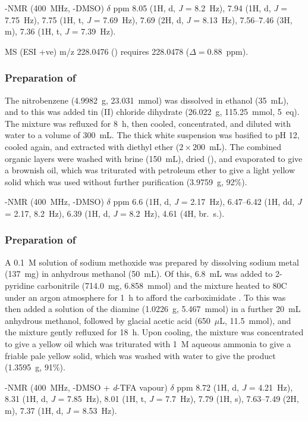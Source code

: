 \begin{refsection}
-NMR (400~MHz, -DMSO) $\delta$ ppm 8.05 (1H, d, \emph{J} = 8.2~Hz), 7.94 (1H, d, \emph{J} = 7.75~Hz), 7.75 (1H, t, \emph{J} = 7.69~Hz), 7.69 (2H, d, \emph{J} = 8.13~Hz), 7.56--7.46 (3H, m), 7.36 (1H, t, \emph{J} = 7.39~Hz).

MS (ESI +ve) m/z 228.0476 ()  requires 228.0478 ($\Delta=0.88$~ppm).

\subsubsection{Preparation of }
The nitrobenzene (4.9982~g, 23.031~mmol) was dissolved in ethanol (35~mL), and to this was added tin (II) chloride dihydrate (26.022~g, 115.25~mmol, 5~eq).
The mixture was refluxed for 8~h, then cooled, concentrated, and diluted with water to a volume of 300~mL.
The thick white suspension was basified to pH 12, cooled again, and extracted with diethyl ether ($2\times200$~mL).
The combined organic layers were washed with brine (150~mL), dried (), and evaporated to give a brownish oil, which was triturated with petroleum ether to give a light yellow solid which was used without further purification (3.9759~g, 92\%).\autocite{Urban2011}

-NMR (400~MHz, -DMSO) $\delta$ ppm 6.6 (1H, d, \emph{J} = 2.17~Hz), 6.47--6.42 (1H, dd, \emph{J} = 2.17, 8.2~Hz), 6.39 (1H, d, \emph{J} = 8.2~Hz), 4.61 (4H, br.\ s.).

\subsubsection{Preparation of }
A 0.1~M solution of sodium methoxide was prepared by dissolving sodium metal (137~mg) in anhydrous methanol (50~mL).
Of this, 6.8~mL was added to 2-pyridine carbonitrile (714.0~mg, 6.858~mmol) and the mixture heated to 80\degree{}C under an argon atmosphere for 1~h to afford the carboximidate .
To this was then added a solution of the diamine  (1.0226~g, 5.467~mmol) in a further 20~mL anhydrous methanol, followed by glacial acetic acid (650~$\mu$L, 11.5~mmol), and the mixture gently refluxed for 18~h.
Upon cooling, the mixture was concentrated to give a yellow oil which was triturated with 1~M aqueous ammonia to give a friable pale yellow solid, which was washed with water to give the product (1.3595~g, 91\%).\autocite{Conn2011}

-NMR (400~MHz, -DMSO + \textit{d}-TFA vapour) $\delta$ ppm 8.72 (1H, d, \emph{J} = 4.21~Hz), 8.31 (1H, d, \emph{J} = 7.85~Hz), 8.01 (1H, t, \emph{J} = 7.7~Hz), 7.79 (1H, s), 7.63--7.49 (2H, m), 7.37 (1H, d, \emph{J} = 8.53~Hz).


\end{refsection}
